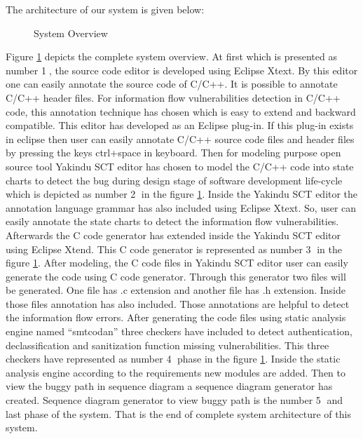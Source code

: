 The architecture of our system is given below:
\begin{figure}[htbp]
	\centering
	\caption{System Overview}
	\label{system_architecture}
\end{figure}

Figure \ref{system_architecture} depicts the complete system overview. At first which is presented as number \textcircled{1}, the source code editor is developed using Eclipse Xtext. By this editor one can easily annotate the source code of C/C++. It is possible to annotate C/C++ header files. For information flow vulnerabilities detection in C/C++ code, this annotation technique has chosen which is easy to extend and backward compatible. This editor has developed as an Eclipse plug-in. If this plug-in exists in eclipse then user can easily annotate C/C++ source code files and header files by pressing the keys ctrl+space in keyboard. Then for modeling purpose open source tool Yakindu SCT editor \cite{ref_15_yakindu:sct} has chosen to model the C/C++ code into state charts to detect the bug during design stage of software development life-cycle which is depicted as number \textcircled{2} in the figure \ref{system_architecture}. Inside the Yakindu SCT editor the annotation language grammar has also included using Eclipse Xtext. So, user can easily annotate the state charts to detect the information flow vulnerabilities. Afterwards the C code generator has extended inside the Yakindu SCT editor using Eclipse Xtend. This C code generator is represented as number \textcircled{3} in the figure \ref{system_architecture}. After modeling, the C code files in Yakindu SCT editor user can easily generate the code using C code generator. Through this generator two files will be generated. One file has .c extension and another file has .h extension. Inside those files annotation has also included. Those annotations are helpful to detect the information flow errors. After generating the code files using static analysis engine named \enquote{smtcodan} three checkers have included to detect authentication, declassification and sanitization function missing vulnerabilities. This three checkers have represented as number \textcircled{4} phase in the figure \ref{system_architecture}. Inside the static analysis engine according to the requirements new modules are added. Then to view the buggy path in sequence diagram a sequence diagram generator has created. Sequence diagram generator to view buggy path is the number \textcircled{5} and last phase of the system. That is the end of complete system architecture of this system. 



